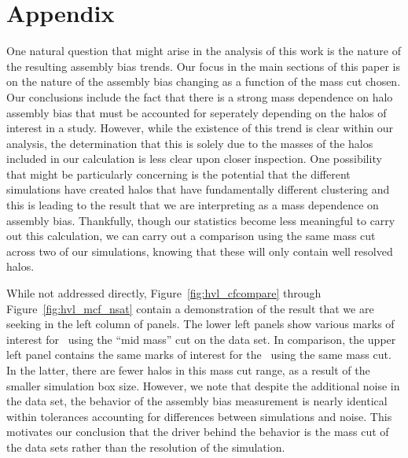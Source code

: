 \documentclass[usenatbib]{mnras}
\begin{document}
\section*{Appendix}
\label{section:appendix_massres}

One natural question that might arise in the analysis of this work is the nature of the resulting assembly bias
trends. Our focus in the main sections of this paper is on the nature of the assembly bias changing as a function
of the mass cut chosen. Our conclusions include the fact that there is a strong mass dependence on halo assembly
bias that must be accounted for seperately depending on the halos of interest in a study. However, while the
existence of this trend is clear within our analysis, the determination that this is solely due to the masses of
the halos included in our calculation is less clear upon closer inspection. One possibility that might be
particularly concerning is the potential that the different simulations have created halos that have
fundamentally different clustering and this is leading to the result that we are interpreting as a mass
dependence on assembly bias. Thankfully, though our statistics become less meaningful to carry out this
calculation, we can carry out a comparison using the same mass cut across two of our simulations, knowing that
these will only contain well resolved halos.

While not addressed directly, Figure~\ref{fig:hvl_cfcompare} through Figure~\ref{fig:hvl_mcf_nsat} contain a
demonstration of the result that we are seeking in the left column of panels. The lower left panels show various
marks of interest for \simB \ using the ``mid mass'' cut on the data set. In comparison, the upper left panel
contains the same marks of interest for the \simA \ using the same mass cut. In the latter, there are fewer halos
in this mass cut range, as a result of the smaller simulation box size. However, we note that despite the
additional noise in the data set, the behavior of the assembly bias measurement is nearly identical within
tolerances accounting for differences between simulations and noise. This motivates our conclusion that the
driver behind the behavior is the mass cut of the data sets rather than the resolution of the simulation.

\label{lastpage}
\end{document}
